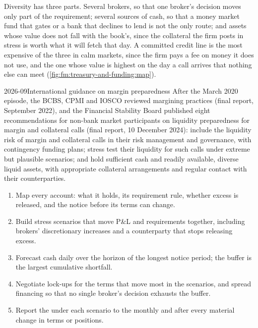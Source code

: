 Diversity has three parts. Several brokers, so that one broker's decision moves only part of the requirement; several sources of cash, so that a
money market fund that gates or a bank that declines to lend is not the only route; and assets whose value does not fall with the book's, since the
collateral the firm posts in stress is worth what it will fetch that day. A committed credit line is the most expensive of the three in calm
markets, since the firm pays a fee on money it does not use, and the one whose value is highest on the day a call arrives that nothing else can
meet (\cref{fig:fm:treasury-and-funding:map}).

\begin{dated}{2026-09}{International guidance on margin preparedness}\label{dat:fm:treasury-and-funding:fsb}
After the March 2020 episode, the BCBS, CPMI and IOSCO reviewed margining practices (final report, September 2022), and the Financial Stability
Board published eight recommendations for non-bank market participants on liquidity preparedness for margin and collateral calls (final report, 10
December 2024): include the liquidity risk of margin and collateral calls in their risk management and governance, with contingency funding plans;
stress test their liquidity for such calls under extreme but plausible scenarios; and hold sufficient cash and readily available, diverse liquid
assets, with appropriate collateral arrangements and regular contact with their counterparties.
\end{dated}

\begin{method}\label{met:fm:treasury-and-funding:buffer}
\begin{enumerate}
\item Map every account: what it holds, its requirement rule, whether excess is released, and the notice before its terms can change.
\item Build stress scenarios that move P\&L and requirements together, including brokers' discretionary increases and a counterparty that stops
releasing excess.
\item Forecast cash daily over the horizon of the longest notice period; the buffer is the largest cumulative shortfall.
\item Negotiate lock-ups for the terms that move most in the scenarios, and spread financing so that no single broker's decision exhausts the buffer.
\item Report the  under each scenario to the  monthly and after every material change in terms or positions.
\end{enumerate}
\end{method}

